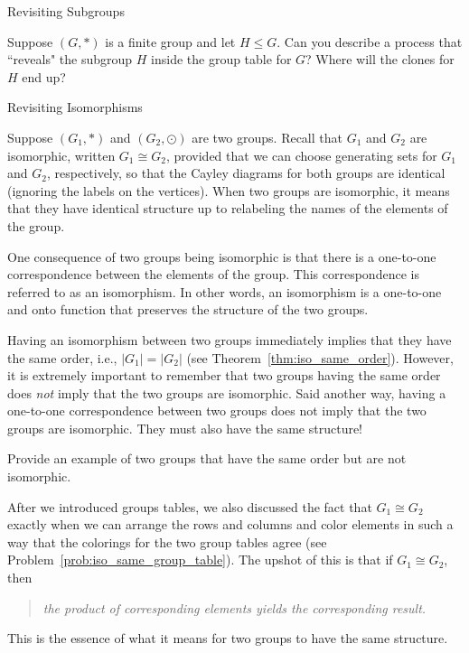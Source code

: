 \begin{section}{Revisiting Subgroups}
\begin{problem}
Suppose $(G,*)$ is a finite group and let $H\leq G$.  Can you describe a process that ``reveals" the subgroup $H$ inside the group table for $G$?  Where will the clones for $H$ end up?
\end{problem}

\end{section}

\begin{section}{Revisiting Isomorphisms}

Suppose $(G_1,*)$ and $(G_2,\odot)$ are two groups.  Recall that $G_1$ and $G_2$ are isomorphic, written $G_1\cong G_2$, provided that we can choose generating sets for $G_1$ and $G_2$, respectively, so that the Cayley diagrams for both groups are identical (ignoring the labels on the vertices).  When two groups are isomorphic, it means that they have identical structure up to relabeling the names of the elements of the group.

One consequence of two groups being isomorphic is that there is a one-to-one correspondence between the elements of the group.  This correspondence is referred to as an isomorphism.  In other words, an isomorphism is a one-to-one and onto function that preserves the structure of the two groups.  

Having an isomorphism between two groups immediately implies that they have the same order, i.e., $|G_1|=|G_2|$ (see Theorem~\ref{thm:iso_same_order}).  However, it is extremely important to remember that two groups having the same order does \emph{not} imply that the two groups are isomorphic.  Said another way, having a one-to-one correspondence between two groups does not imply that the two groups are isomorphic.  They must also have the same structure!

\begin{exercise}
Provide an example of two groups that have the same order but are not isomorphic.
\end{exercise}

After we introduced groups tables, we also discussed the fact that $G_1\cong G_2$ exactly when we can arrange the rows and columns and color elements in such a way that the colorings for the two group tables agree (see Problem~\ref{prob:iso_same_group_table}).  The upshot of this is that if $G_1\cong G_2$, then
\begin{quotation}
\emph{the product of corresponding elements yields the corresponding result.}
\end{quotation}
This is the essence of what it means for two groups to have the same structure.  


\end{section}

